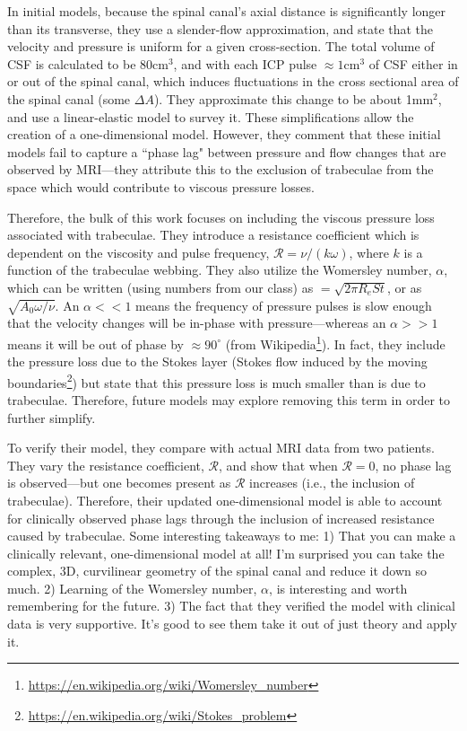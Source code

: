 In initial models, because the spinal canal's axial distance is significantly longer than its transverse, they use a slender-flow approximation, and state that the velocity and pressure is uniform for a given cross-section. The total volume of CSF is calculated to be 80cm$^3$, and with each ICP pulse $\approx 1$cm$^3$ of CSF either in or out of the spinal canal, which induces fluctuations in the cross sectional area of the spinal canal (some $\Delta A$). They approximate this change to be about 1mm$^2$, and use a linear-elastic model to survey it. These simplifications allow the creation of a one-dimensional model. However, they comment that these initial models fail to capture a ``phase lag" between pressure and flow changes that are observed by MRI---they attribute this to the exclusion of trabeculae from the space which would contribute to viscous pressure losses.\newline

Therefore, the bulk of this work focuses on including the viscous pressure loss associated with trabeculae. They introduce a resistance coefficient which is dependent on the viscosity and pulse frequency, $\mathcal{R} =\nu / (k\omega)$, where $k$ is a function of the trabeculae webbing. They also utilize the Womersley number, $\alpha$, which can be written (using numbers from our class) as $=\sqrt{2\pi R_eSt}$, or as $\sqrt{A_0\omega /\nu}$. An $\alpha << 1$ means the frequency of pressure pulses is slow enough that the velocity changes will be in-phase with pressure---whereas an $\alpha >> 1$ means it will be out of phase by $\approx 90^\circ$ (from Wikipedia\footnote{\url{https://en.wikipedia.org/wiki/Womersley_number}}). In fact, they include the pressure loss due to the Stokes layer (Stokes flow induced by the moving boundaries\footnote{\url{https://en.wikipedia.org/wiki/Stokes_problem}}) but state that this pressure loss is much smaller than is due to trabeculae. Therefore, future models may explore removing this term in order to further simplify.  \newline

To verify their model, they compare with actual MRI data from two patients. They vary the resistance coefficient, $\mathcal{R}$, and show that when $\mathcal{R} = 0$, no phase lag is observed---but one becomes present as $\mathcal{R}$ increases (i.e., the inclusion of trabeculae). Therefore, their updated one-dimensional model is able to account for clinically observed phase lags through the inclusion of increased resistance caused by trabeculae. Some interesting takeaways to me: 1) That you can make a clinically relevant, one-dimensional model at all! I'm surprised you can take the complex, 3D, curvilinear geometry of the spinal canal and reduce it down so much. 2) Learning of the Womersley number, $\alpha$, is interesting and worth remembering for the future. 3) The fact that they verified the model with clinical data is very supportive. It's good to see them take it out of just theory and apply it. 


